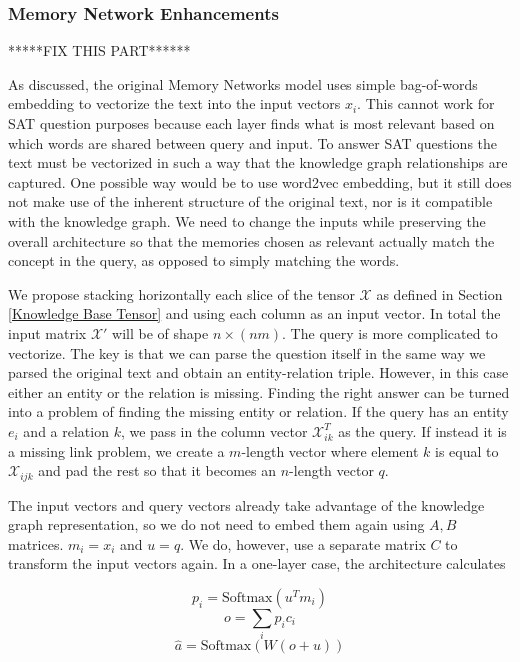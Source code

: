 \documentclass[pageno]{jpaper}
\begin{document}
\subsubsection{Memory Network Enhancements}
\label{Memory Network Enhancements}

*****FIX THIS PART******

As discussed, the original Memory Networks model uses simple bag-of-words
embedding to vectorize the text into the input vectors ${x_i}$. This cannot work
for SAT question purposes because each layer finds what is most relevant based
on which words are shared between query and input. To answer SAT questions the
text must be vectorized in such a way that the knowledge graph relationships are
captured. One possible way would be to use word2vec embedding, but it still does
not make use of the inherent structure of the original text, nor is it
compatible with the knowledge graph. We need to change the inputs while preserving
the overall architecture so that the memories chosen as relevant actually match
the concept in the query, as opposed to simply matching the words.

We propose stacking horizontally each slice of the tensor $\mathcal{X}$ as
defined in Section \ref{Knowledge Base Tensor} and using each column as an input
vector. In total the input matrix $\mathcal{X}'$ will be of shape $n\times
(nm)$. The query is more complicated to vectorize. The key is that we can parse
the question itself in the same way we parsed the original text and obtain an
entity-relation triple. However, in this case either an entity or the relation
is missing. Finding the right answer can be turned into a problem of finding the
missing entity or relation. If the query has an entity $e_i$ and a relation $k$,
we pass in the column vector $\mathcal{X}_{ik}^T$ as the query. If instead it is
a missing link problem, we create a $m$-length vector where element $k$ is equal
to $\mathcal{X}_{ijk}$ and pad the rest so that it becomes an $n$-length vector
$q$.

The input vectors and query vectors already take advantage of the knowledge
graph representation, so we do not need to embed them again using $A,B$
matrices. ${m_i} = {x_i}$ and $u = q$. We do, however, use a separate matrix $C$
to transform the input vectors again. In a one-layer case, the architecture
calculates

$$p_i = \text{Softmax}\left(u^Tm_i\right)$$
$$o = \sum_i p_ic_i$$
$$\hat{a} = \text{Softmax}\left(W\left(o+u\right)\right)$$
\end{document}
